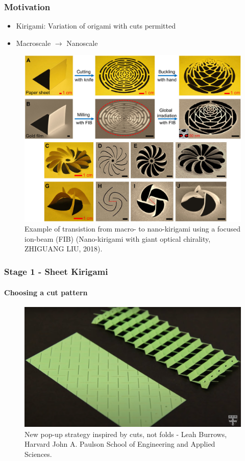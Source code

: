 \documentclass[
	10pt, %
]{beamer}
\begin{document}
\begin{frame}
	\frametitle{Motivation}

	\begin{itemize}
		\item Kirigami: Variation of origami with cuts permitted
		\item Macroscale $\to$ Nanoscale
	\end{itemize}
	\vspace*{10px}

	\begin{figure}
		\includegraphics[height=0.6\textheight]{figures/kirigami_example.jpeg}
		\caption{Example of transistion from macro- to nano-kirigami using a focused ion-beam (FIB) (Nano-kirigami with giant optical chirality, ZHIGUANG LIU, 2018).}
	\end{figure}	

\end{frame}

\begin{frame}
	\frametitle{Stage 1 - Sheet Kirigami}
	\framesubtitle{Choosing a cut pattern}

	\begin{figure}
		\includegraphics[height=0.6\textheight]{figures/kirigami_pattern_inspiration.png}
		\caption{New pop-up strategy inspired by cuts, not folds - Leah Burrows, Harvard John A. Paulson School of Engineering and Applied Sciences.}
	\end{figure}	
\end{frame}
\end{document}

